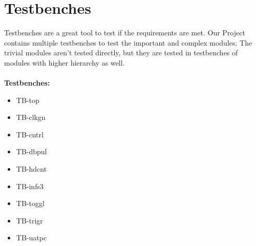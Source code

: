 \documentclass[12pt,a4 paper] {report}
\begin{document}
\newpage

\chapter{Testbenches}
Testbenches are a great tool to test if the requirements are met. Our Project contains multiple testbenches to test the
important and complex modules. The trivial modules aren't tested directly, but they are tested in testbenches of modules 
with higher hierarchy as well. \\ \\
\textbf{Testbenches:}
\begin{itemize}
	\item TB-top
	\item TB-clkgn
	\item TB-cntrl
	\item TB-dbpul
	\item TB-hdcnt
	\item TB-infs3
	\item TB-toggl
	\item TB-trigr
	\item TB-uatpc
\end{itemize}

\newpage
\end{document}
